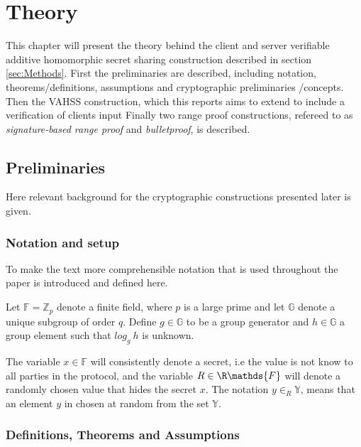 \chapter{Theory}
This chapter will present the theory behind the client and server verifiable additive homomorphic secret sharing construction described in section \ref{sec:Methods}.  First  the preliminaries are described, including notation, theorems/definitions, assumptions  and cryptographic preliminaries /concepts. Then the VAHSS \cite{SumItUp} \cite{VAHSS} construction, which this reports aims to extend to include  a verification of clients input   Finally two  range proof constructions, refereed to as \textit{signature-based range proof} and \textit{bulletproof}, is described. 


\section{Preliminaries}
Here relevant background for the cryptographic constructions presented later is given. 
\subsection*{Notation and setup}
To make the text more comprehensible notation that is used throughout the paper is introduced and defined here.  



Let $\mathds{F}=\mathds{Z}_p$ denote a finite field, where $p$ is a large prime and let $\mathds{G}$ denote a unique subgroup of order $q$.  Define $g\in\mathds{G}$ to be a group generator and $h\in\mathds{G}$ a group element such that  $log_g\:h$ is unknown. 

The variable $x\in\mathds{F}$ will consistently denote a secret, i.e the value is not know to all parties in the protocol, and the variable $R\in\R\mathds{F}$ will denote a randomly chosen value that hides the secret $x$. The notation $y\in_R\mathds{Y}$, means that an element $y$ in chosen at random from the set $\mathds{Y}$.

\subsection*{Definitions, Theorems and Assumptions}

